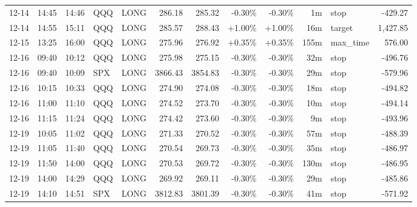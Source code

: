 \documentclass[11pt,a4paper,twoside]{article}
\begin{document}
\begin{center}
\begin{longtable}{>{\color{txtmain}}l l l l l r r r r r >{\color{txtmain}}l r}
12-14 & 14:45 & 14:46 & QQQ & LONG & 286.18 & 285.32 & \textcolor{lossred}{-0.30\%} & \textcolor{lossred}{-0.30\%} & 1m & stop & \textcolor{lossred}{-429.27} \\
12-14 & 14:55 & 15:11 & QQQ & LONG & 285.57 & 288.43 & \textcolor{wingreen}{+1.00\%} & \textcolor{wingreen}{+1.00\%} & 16m & target & \textcolor{wingreen}{1,427.85} \\
12-15 & 13:25 & 16:00 & QQQ & LONG & 275.96 & 276.92 & \textcolor{wingreen}{+0.35\%} & \textcolor{wingreen}{+0.35\%} & 155m & max\_time & \textcolor{wingreen}{576.00} \\
12-16 & 09:40 & 10:12 & QQQ & LONG & 275.98 & 275.15 & \textcolor{lossred}{-0.30\%} & \textcolor{lossred}{-0.30\%} & 32m & stop & \textcolor{lossred}{-496.76} \\
12-16 & 09:40 & 10:09 & SPX & LONG & 3866.43 & 3854.83 & \textcolor{lossred}{-0.30\%} & \textcolor{lossred}{-0.30\%} & 29m & stop & \textcolor{lossred}{-579.96} \\
12-16 & 10:15 & 10:33 & QQQ & LONG & 274.90 & 274.08 & \textcolor{lossred}{-0.30\%} & \textcolor{lossred}{-0.30\%} & 18m & stop & \textcolor{lossred}{-494.82} \\
12-16 & 11:00 & 11:10 & QQQ & LONG & 274.52 & 273.70 & \textcolor{lossred}{-0.30\%} & \textcolor{lossred}{-0.30\%} & 10m & stop & \textcolor{lossred}{-494.14} \\
12-16 & 11:15 & 11:24 & QQQ & LONG & 274.42 & 273.60 & \textcolor{lossred}{-0.30\%} & \textcolor{lossred}{-0.30\%} & 9m & stop & \textcolor{lossred}{-493.96} \\
12-19 & 10:05 & 11:02 & QQQ & LONG & 271.33 & 270.52 & \textcolor{lossred}{-0.30\%} & \textcolor{lossred}{-0.30\%} & 57m & stop & \textcolor{lossred}{-488.39} \\
12-19 & 11:05 & 11:40 & QQQ & LONG & 270.54 & 269.73 & \textcolor{lossred}{-0.30\%} & \textcolor{lossred}{-0.30\%} & 35m & stop & \textcolor{lossred}{-486.97} \\
12-19 & 11:50 & 14:00 & QQQ & LONG & 270.53 & 269.72 & \textcolor{lossred}{-0.30\%} & \textcolor{lossred}{-0.30\%} & 130m & stop & \textcolor{lossred}{-486.95} \\
12-19 & 14:00 & 14:29 & QQQ & LONG & 269.92 & 269.11 & \textcolor{lossred}{-0.30\%} & \textcolor{lossred}{-0.30\%} & 29m & stop & \textcolor{lossred}{-485.86} \\
12-19 & 14:10 & 14:51 & SPX & LONG & 3812.83 & 3801.39 & \textcolor{lossred}{-0.30\%} & \textcolor{lossred}{-0.30\%} & 41m & stop & \textcolor{lossred}{-571.92} \\

\end{longtable}
\end{center}
\end{document}
